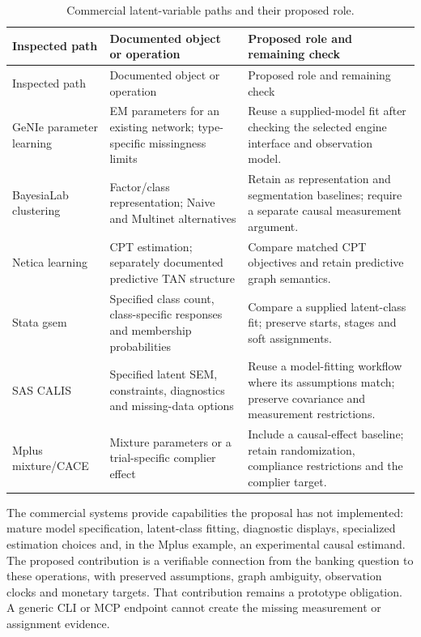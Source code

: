 \begin{longtable}{@{}p{.22\linewidth}p{.35\linewidth}p{.35\linewidth}@{}}
\caption{Commercial latent-variable paths and their proposed role.}
\label{exec13:latent-commercial-table}\\
\toprule
Inspected path & Documented object or operation & Proposed role and remaining check \\
\midrule
\endfirsthead
\toprule
Inspected path & Documented object or operation & Proposed role and remaining check \\
\midrule
\endhead
GeNIe parameter learning & EM parameters for an existing network; type-specific missingness limits & Reuse a supplied-model fit after checking the selected engine interface and observation model. \\
BayesiaLab clustering & Factor/class representation; Naive and Multinet alternatives & Retain as representation and segmentation baselines; require a separate causal measurement argument. \\
Netica learning & CPT estimation; separately documented predictive TAN structure & Compare matched CPT objectives and retain predictive graph semantics. \\
Stata gsem & Specified class count, class-specific responses and membership probabilities & Compare a supplied latent-class fit; preserve starts, stages and soft assignments. \\
SAS CALIS & Specified latent SEM, constraints, diagnostics and missing-data options & Reuse a model-fitting workflow where its assumptions match; preserve covariance and measurement restrictions. \\
Mplus mixture/CACE & Mixture parameters or a trial-specific complier effect & Include a causal-effect baseline; retain randomization, compliance restrictions and the complier target. \\
\bottomrule
\end{longtable}

The commercial systems provide capabilities the proposal has not
implemented: mature model specification, latent-class fitting,
diagnostic displays, specialized estimation choices and, in the Mplus
example, an experimental causal estimand. The proposed contribution is a
verifiable connection from the banking question to these operations,
with preserved assumptions, graph ambiguity, observation clocks and
monetary targets. That contribution remains a prototype obligation. A
generic CLI or MCP endpoint cannot create the missing measurement or
assignment evidence.

